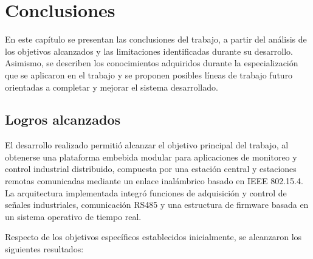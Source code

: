 \chapter{Conclusiones}
\label{Chapter5}
En este capítulo se presentan las conclusiones del trabajo, a partir del análisis de los objetivos alcanzados y las limitaciones identificadas durante su desarrollo. Asimismo, se describen los conocimientos adquiridos durante la especialización que se aplicaron en el trabajo y se proponen posibles líneas de trabajo futuro orientadas a completar y mejorar el sistema desarrollado.

\section{Logros alcanzados}

El desarrollo realizado permitió alcanzar el objetivo principal del trabajo, al obtenerse una plataforma embebida modular para aplicaciones de monitoreo y control industrial distribuido, compuesta por una estación central y estaciones remotas comunicadas mediante un enlace inalámbrico basado en IEEE 802.15.4. La arquitectura implementada integró funciones de adquisición y control de señales industriales, comunicación RS485 y una estructura de firmware basada en un sistema operativo de tiempo real.

Respecto de los objetivos específicos establecidos inicialmente, se alcanzaron los siguientes resultados:

